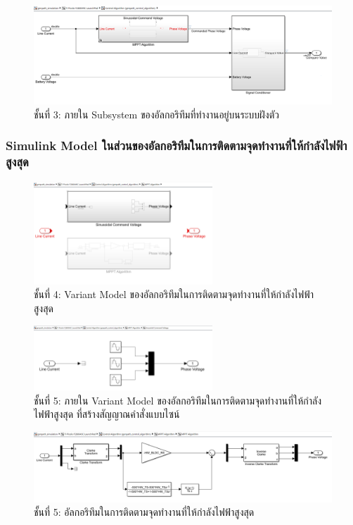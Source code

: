 \documentclass[11pt,a4paper]{article}
\begin{document}
\begin{figure}[H]
    \centering
    \includegraphics[width=\textwidth]{l3-control-algo.png}
    \caption{ชั้นที่ 3: ภายใน Subsystem ของอัลกอริทึมที่ทำงานอยู่บนระบบฝังตัว}
\end{figure}

\subsubsection{Simulink Model ในส่วนของอัลกอริทึมในการติดตามจุดทำงานที่ให้กำลังไฟฟ้าสูงสุด}

\begin{figure}[H]
    \centering
    \includegraphics[width=0.6\textwidth]{l4-mppt.png}
    \caption{ชั้นที่ 4: Variant Model ของอัลกอริทึมในการติดตามจุดทำงานที่ให้กำลังไฟฟ้าสูงสุด}
\end{figure}

\begin{figure}[H]
    \centering
    \includegraphics[width=0.6\textwidth]{l5-sin.png}
    \caption{ชั้นที่ 5: ภายใน Variant Model ของอัลกอริทึมในการติดตามจุดทำงานที่ให้กำลังไฟฟ้าสูงสุด ที่สร้างสัญญาณคำสั่งแบบไซน์}
\end{figure}

\begin{figure}[H]
    \centering
    \includegraphics[width=\textwidth]{l5-mppt.png}
    \caption{ชั้นที่ 5: อัลกอริทึมในการติดตามจุดทำงานที่ให้กำลังไฟฟ้าสูงสุด}
\end{figure}
\end{document}
